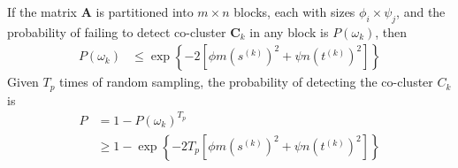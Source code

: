 
\newpage
\appendix

\begin{theorem}
    \label{thm:probability_co_cluster_detection}
    If the matrix $\mathbf{A}$ is partitioned into $m \times n$ blocks, each with sizes $\phi_i \times \psi_j$, and the probability of failing to detect co-cluster $\mathbf{C}_k$ in any block is $P(\omega_k)$, then
    \begin{equation}
        \begin{split}
            P(\omega_k) & \le \exp \left\{ -2 [\phi m (s^{(k)})^2 + \psi n (t^{(k)})^2] \right\}
        \end{split}
    \end{equation}
    Given $T_p$ times of random sampling, the probability of detecting the co-cluster $C_k$ is
    \begin{equation}
        \begin{split}
            P & = 1 - P(\omega_k)^{T_p}                                                        \\
              & \ge 1 - \exp \left\{ -2 T_p [\phi m (s^{(k)})^2 + \psi n (t^{(k)})^2] \right\}
        \end{split}
    \end{equation}

\end{theorem}

